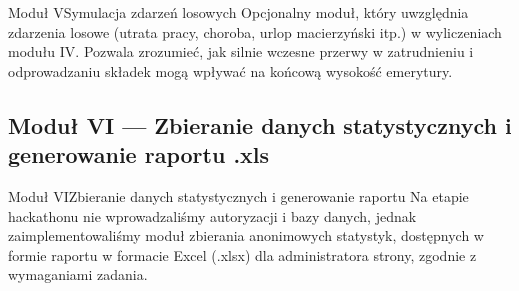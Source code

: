 \begin{frame}[t]{Moduł V}{Symulacja zdarzeń losowych}
Opcjonalny moduł, który uwzględnia zdarzenia losowe (utrata pracy, choroba, urlop macierzyński itp.)
w wyliczeniach modułu IV.
\pause
Pozwala zrozumieć, jak silnie wczesne przerwy w zatrudnieniu i odprowadzaniu składek
mogą wpływać na końcową wysokość emerytury.
\end{frame}

\subsection{Moduł VI --- Zbieranie danych statystycznych i generowanie raportu .xls}

\begin{frame}[t]{Moduł VI}{Zbieranie danych statystycznych i generowanie raportu}
Na etapie hackathonu nie wprowadzaliśmy autoryzacji i bazy danych,
jednak zaimplementowaliśmy moduł zbierania anonimowych statystyk,
dostępnych w formie raportu w formacie Excel (.xlsx) dla administratora strony,
zgodnie z wymaganiami zadania.
\end{frame}